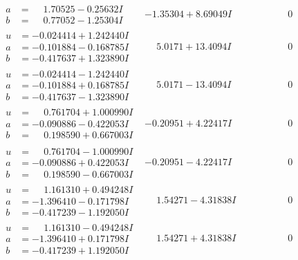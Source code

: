 \documentclass[1p]{elsarticle_modified}
\theoremstyle{definition}
\begin{document}
$$\begin{array}{c|c|c}
\begin{aligned}
a &= \phantom{-}1.70525 - 0.25632 I \\
b &= \phantom{-}0.77052 - 1.25304 I\end{aligned}
 & -1.35304 + 8.69049 I & \phantom{-0.000000 } 0 \\ \hline\begin{aligned}
u &= -0.024414 + 1.242440 I \\
a &= -0.101884 - 0.168785 I \\
b &= -0.417637 + 1.323890 I\end{aligned}
 & \phantom{-}5.0171 + 13.4094 I & \phantom{-0.000000 } 0 \\ \hline\begin{aligned}
u &= -0.024414 - 1.242440 I \\
a &= -0.101884 + 0.168785 I \\
b &= -0.417637 - 1.323890 I\end{aligned}
 & \phantom{-}5.0171 - 13.4094 I & \phantom{-0.000000 } 0 \\ \hline\begin{aligned}
u &= \phantom{-}0.761704 + 1.000990 I \\
a &= -0.090886 - 0.422053 I \\
b &= \phantom{-}0.198590 + 0.667003 I\end{aligned}
 & -0.20951 + 4.22417 I & \phantom{-0.000000 } 0 \\ \hline\begin{aligned}
u &= \phantom{-}0.761704 - 1.000990 I \\
a &= -0.090886 + 0.422053 I \\
b &= \phantom{-}0.198590 - 0.667003 I\end{aligned}
 & -0.20951 - 4.22417 I & \phantom{-0.000000 } 0 \\ \hline\begin{aligned}
u &= \phantom{-}1.161310 + 0.494248 I \\
a &= -1.396410 - 0.171798 I \\
b &= -0.417239 - 1.192050 I\end{aligned}
 & \phantom{-}1.54271 - 4.31838 I & \phantom{-0.000000 } 0 \\ \hline\begin{aligned}
u &= \phantom{-}1.161310 - 0.494248 I \\
a &= -1.396410 + 0.171798 I \\
b &= -0.417239 + 1.192050 I\end{aligned}
 & \phantom{-}1.54271 + 4.31838 I & \phantom{-0.000000 } 0 \\ \hline\begin{aligned}

\end{aligned}
\end{array}$$
\end{document}
